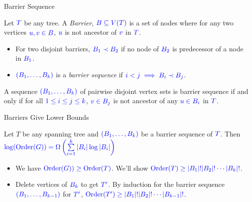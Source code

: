 \documentclass[10pt]{beamer}
\DeclareMathOperator{\order}{Order}
\begin{document}
\begin{frame}{Barrier Sequence}
	\begin{definition}[Barrier]
		Let $\mathcolor{blue}{T}$ be any tree. A \emph{Barrier}, $\mathcolor{blue}{B\subseteq V(T)}$ is a set of nodes where for any two vertices $\mathcolor{blue}{u,v\in B}$, $\mathcolor{blue}{u}$ is not ancestor of $\mathcolor{blue}{v}$ in $\mathcolor{blue}{T}$.
	\end{definition}
	\pause
	\begin{itemize}
		\item For two disjoint barriers, $\mathcolor{blue}{B_1\prec B_2}$ if no node of $\mathcolor{blue}{B_2}$ is predecessor of a node in $\mathcolor{blue}{B_1}$.\pause
		\item $\mathcolor{blue}{(B_1,\dots, B_k)}$ is a \emph{barrier sequence} if  $\mathcolor{blue}{i<j\implies B_i\prec B_j}$.\pause
	\end{itemize}
	\vfill

	\begin{lemma}
		A sequence $\mathcolor{blue}{(B_1,\dots, B_k)}$ of pairwise disjoint vertex sets is barrier sequence if and only if for all $\mathcolor{blue}{1\leq i\leq j\leq k}$, $\mathcolor{blue}{v\in B_j}$ is not ancestor of any $\mathcolor{blue}{u\in B_i}$ in $\mathcolor{blue}{T}$.
	\end{lemma}
\end{frame}

\begin{frame}{Barriers Give Lower Bounds}
	\begin{lemma}
		Let $T$ be any spanning tree and $\mathcolor{blue}{(B_1,\dots, B_k)}$ be a barrier sequence of $\mathcolor{blue}{T}$. Then $\mathcolor{blue}{\log(\order(G))=\Omega\left(\sum\limits_{i=1}^k|B_i|\log|B_i|\right)}$
	\end{lemma}\vfill \pause

	\begin{itemize}
		\item We have $\mathcolor{blue}{\order(G))\geq \order(T)}$. We'll show $\mathcolor{blue}{\order(T)\geq |B_1|!|B_2|!\cdots|B_k|!}$.\pause \vfill
		\item Delete vertices of $\mathcolor{blue}{B_k}$ to get $\mathcolor{blue}{T'}$. By induction for the barrier sequence $\mathcolor{blue}{(B_1,\dots, B_{k-1})}$ for $\mathcolor{blue}{T'}$, $\mathcolor{blue}{\order(T')\geq |B_1|!|B_2|!\cdots|B_{k-1}|!}$.
	\end{itemize}
\end{frame}
\end{document}
